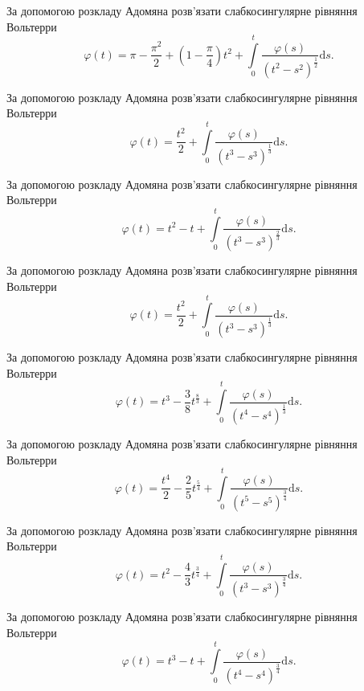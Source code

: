 \documentclass[12pt]{extarticle}
\begin{document}
\begin{Exercise}
За допомогою розкладу Адомяна розв’язати слабкосингулярне рівняння Вольтерри \[\varphi(t) = \pi - \dfrac{\pi^2}{2} + \left(1-\dfrac{\pi}{4}\right) t^2 + \int\limits_{0}^{t} \dfrac{\varphi(s)}{\left(t^2 - s^2\right)^\frac{1}{2}} \mathrm{d}s.\]
\end{Exercise}

\begin{Exercise}
За допомогою розкладу Адомяна розв’язати слабкосингулярне рівняння Вольтерри \[\varphi(t) = \dfrac{t^2}{2} + \int\limits_{0}^{t} \dfrac{\varphi(s)}{\left(t^3 - s^3\right)^\frac{1}{3}} \mathrm{d}s.\]
\end{Exercise}

\begin{Exercise}
За допомогою розкладу Адомяна розв’язати слабкосингулярне рівняння Вольтерри \[\varphi(t) = t^2 -t + \int\limits_{0}^{t} \dfrac{\varphi(s)}{\left(t^3 - s^3\right)^\frac{2}{3}} \mathrm{d}s.\]
\end{Exercise}

\begin{Exercise}
За допомогою розкладу Адомяна розв’язати слабкосингулярне рівняння Вольтерри \[\varphi(t) = \dfrac{t^2}{2} + \int\limits_{0}^{t} \dfrac{\varphi(s)}{\left(t^3 - s^3\right)^\frac{1}{3}} \mathrm{d}s.\]
\end{Exercise}

\begin{Exercise}
За допомогою розкладу Адомяна розв’язати слабкосингулярне рівняння Вольтерри \[\varphi(t) = t^3 - \dfrac{3}{8}t^\frac{8}{3} + \int\limits_{0}^{t} \dfrac{\varphi(s)}{\left(t^4 - s^4\right)^\frac{1}{3}} \mathrm{d}s.\]
\end{Exercise}

\begin{Exercise}
За допомогою розкладу Адомяна розв’язати слабкосингулярне рівняння Вольтерри \[\varphi(t) = \dfrac{t^4}{2} - \dfrac{2}{5}t^{\frac{5}{4}} + \int\limits_{0}^{t} \dfrac{\varphi(s)}{\left(t^5 - s^5\right)^\frac{3}{4}} \mathrm{d}s.\]
\end{Exercise}

\begin{Exercise}
За допомогою розкладу Адомяна розв’язати слабкосингулярне рівняння Вольтерри \[\varphi(t) = t^2 - \dfrac{4}{3}t^{\frac{3}{4}} + \int\limits_{0}^{t} \dfrac{\varphi(s)}{\left(t^3 - s^3\right)^\frac{3}{4}} \mathrm{d}s.\]
\end{Exercise}

\begin{Exercise}
За допомогою розкладу Адомяна розв’язати слабкосингулярне рівняння Вольтерри \[\varphi(t) = t^3 - t + \int\limits_{0}^{t} \dfrac{\varphi(s)}{\left(t^4 - s^4\right)^\frac{3}{4}} \mathrm{d}s.\]
\end{Exercise}
\end{document}

